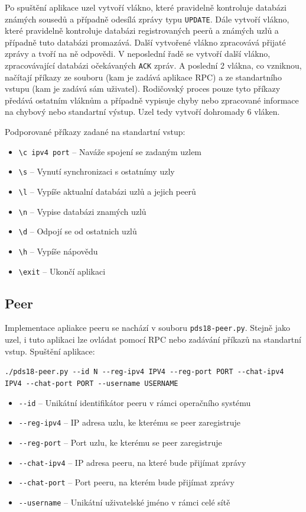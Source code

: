 \documentclass[11pt,a4paper,titlepage]{article}
\begin{document}
            Po spuštění aplikace uzel vytvoří vlákno, které pravidelně kontroluje databázi známých sousedů a případně odesílá
            zprávy typu \texttt{UPDATE}. Dále vytvoří vlákno, které pravidelně kontroluje databázi registrovaných peerů a
            známých uzlů a případně tuto databázi promazává. Další vytvořené vlákno zpracovává přijaté zprávy a tvoří na ně
            odpovědi. V neposlední řadě se vytvoří další vlákno, zpracovávající databázi očekávaných \texttt{ACK} zpráv.
            A poslední 2 vlákna, co vzniknou, načítají příkazy ze souboru (kam je zadává aplikace RPC) a ze standartního
            vstupu (kam je zadává sám uživatel). Rodičovský proces pouze tyto příkazy předává ostatním vláknům a případně vypisuje
            chyby nebo zpracované informace na chybový nebo standartní výstup. Uzel tedy vytvoří dohromady 6 vláken.

            Podporované příkazy zadané na standartní vstup:
            \begin{itemize}
                \item \verb+\c ipv4 port+ -- Naváže spojení se zadaným uzlem
                \item \verb+\s+ -- Vynutí synchronizaci s ostatnímy uzly
                \item \verb+\l+ -- Vypíše aktualní databázi uzlů a jejich peerů
                \item \verb+\n+ -- Vypise databázi znamých uzlů
                \item \verb+\d+ -- Odpojí se od ostatnich uzlů
                \item \verb+\h+ -- Vypíše nápovědu
                \item \verb+\exit+ -- Ukončí aplikaci
            \end{itemize}
        \subsection{Peer}
            Implementace apliakce peeru se nachází v souboru \texttt{pds18-peer.py}. Stejně jako uzel, i tuto aplikaci lze
            ovládat pomocí RPC nebo zadávání příkazů na standartní vstup. Spuštění aplikace:


            \verb+./pds18-peer.py --id N --reg-ipv4 IPV4 --reg-port PORT --chat-ipv4 IPV4 --chat-port PORT --username USERNAME+
            \begin{itemize}
                \item \verb+--id+ -- Unikátní identifikátor peeru v rámci operačního systému
                \item \verb+--reg-ipv4+ -- IP adresa uzlu, ke kterému se peer zaregistruje
                \item \verb+--reg-port+ -- Port uzlu, ke kterému se peer zaregistruje
                \item \verb+--chat-ipv4+ -- IP adresa peeru, na které bude přijímat zprávy
                \item \verb+--chat-port+ -- Port peeru, na kterém bude přijímat zprávy
                \item \verb+--username+ -- Unikátní uživatelské jméno v rámci celé sítě
            \end{itemize}
\end{document}
